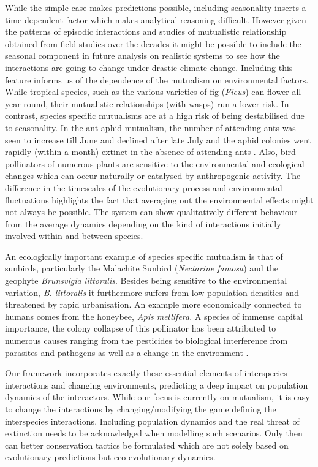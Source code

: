 \documentclass[12pt]{article}
\begin{document}
While the simple case makes predictions possible, including seasonality inserts a time dependent factor which makes analytical reasoning difficult.
However given the patterns of episodic interactions and studies of mutualistic relationship obtained from field studies over the decades it might be possible to include the seasonal component in future analysis on realistic systems to see how the interactions are going to change under drastic climate change.
Including this feature informs us of the dependence of the mutualism on environmental factors.
While tropical species, such as the various varieties of fig (\textit{Ficus}) can flower all year round, their mutualistic relationships (with wasps) run a lower risk.
In contrast, species specific mutualisms are at a high risk of being destabilised due to seasonality.
In the ant-aphid mutualism, the number of attending ants was seen to increase till June and declined after late July and the aphid colonies went rapidly (within a month) extinct in the absence of attending ants \citep{yao:Oikos:2000,yao:JIS:2009}.
Also, bird pollinators of numerous plants are sensitive to the environmental and ecological changes which can occur naturally or catalysed by anthropogenic activity.
The difference in the timescales of the evolutionary process and environmental fluctuations highlights the fact that averaging out the environmental effects might not always be possible.
The system can show qualitatively different behaviour from the average dynamics depending on the kind of interactions initially involved within and between species.

An ecologically important example of species specific mutualism is that of sunbirds, particularly the Malachite Sunbird (\textit{Nectarine famosa}) and the geophyte \textit{Brunsvigia littoralis}.
Besides being sensitive to the environmental variation, \textit{B. littoralis} it furthermore suffers from low population densities \citep{geerts:SAJB:2012} and threatened by rapid urbanisation.
An example more economically connected to humans comes from the honeybee, \textit{Apis mellifera}.
A species of immense capital importance, the colony collapse of this pollinator has been attributed to numerous causes ranging from the pesticides to biological interference from parasites and pathogens as well as a change in the environment \citep{nazzi:PLosPath:2012}.

Our framework incorporates exactly these essential elements of interspecies interactions and changing environments, predicting a deep impact on population dynamics of the interactors.
While our focus is currently on mutualism, it is easy to change the interactions by changing/modifying the game defining the interspecies interactions.
Including population dynamics and the real threat of extinction needs to be acknowledged when modelling such scenarios.
Only then can better conservation tactics be formulated which are not solely based on evolutionary predictions but eco-evolutionary dynamics.
\end{document}
